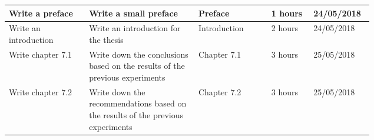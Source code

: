 \begin{longtable}{| p{0.22\linewidth} | p{0.3\linewidth}| p{0.2\linewidth} | l | l |}
Write a preface & Write a small preface & Preface & 1 hours & 24/05/2018 \\
\hline

Write an introduction & Write an introduction for the thesis & Introduction & 2 hours & 24/05/2018 \\
\hline

Write chapter 7.1 & Write down the conclusions based on the results of the previous experiments & Chapter 7.1 & 3 hours & 25/05/2018 \\
\hline

Write chapter 7.2 & Write down the recommendations based on the results of the previous experiments & Chapter 7.2 & 3 hours & 25/05/2018 \\
\hline

\end{longtable}
%